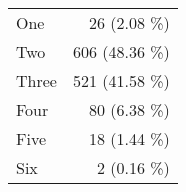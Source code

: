 \begin{tabular}{ l  r }
One & 26 (2.08 \%)\\
Two & 606 (48.36 \%)\\
Three & 521 (41.58 \%)\\
Four & 80 (6.38 \%)\\
Five & 18 (1.44 \%)\\
Six & 2 (0.16 \%)\\
\end{tabular}